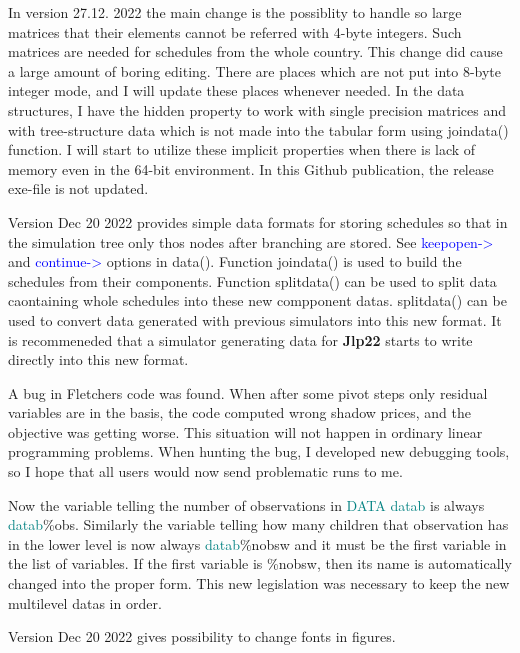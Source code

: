 In version 27.12. 2022 the main change is the possiblity to handle so large matrices that their 
elements cannot be referred with 4-byte integers. Such matrices are needed for schedules from the whole 
country. This change did cause a large amount of boring editing. 
There are places which are not put into 8-byte integer mode, and I will update 
these places whenever needed. 
In the data structures, I have the hidden property to work with single precision matrices and with tree-structure 
data which is not made into the tabular form using \textcolor{VioletRed}{joindata}() function. I will start to 
utilize these implicit properties when there is lack of memory even in the 64-bit environment. 
In this Github publication, 
the release exe-file is not updated. 
 
Version Dec 20 2022 provides simple data formats for storing schedules so that in the simulation tree only thos 
nodes after branching are stored. See \textcolor{blue}{keepopen->} and \textcolor{blue}{continue->} options in \textcolor{VioletRed}{data}(). Function \textcolor{VioletRed}{joindata}() is 
used to build the schedules from their components. Function \textcolor{VioletRed}{splitdata}() can be used to split data caontaining whole 
schedules into these new compponent datas. \textcolor{VioletRed}{splitdata}() can be used to convert data generated with previous simulators 
into this new format. It is recommeneded that a simulator generating data for \textbf{Jlp22} 
starts to write directly into this new format. 
 
A bug in Fletchers code was found. When after some pivot steps only residual variables 
are in the basis, the code computed wrong shadow prices, and the objective was getting worse. 
This situation will not happen in ordinary linear programming problems. When hunting the bug, I developed new 
debugging tools, so I hope that all users would now send problematic 
runs to me. 
 
Now the variable telling the number of observations in \textcolor{teal}{DATA} \textcolor{teal}{datab} is always \textcolor{teal}{datab}\%obs. 
Similarly the variable 
telling how many children that observation has in the lower level 
is now always \textcolor{teal}{datab}\%nobsw and it must be the 
first variable in the list of variables. If the first variable is \%nobsw, then its name is automatically 
changed into the proper form. This new legislation was necessary to keep the new multilevel 
datas in order. 
 
Version Dec 20 2022 gives possibility to change fonts in figures. 
 
